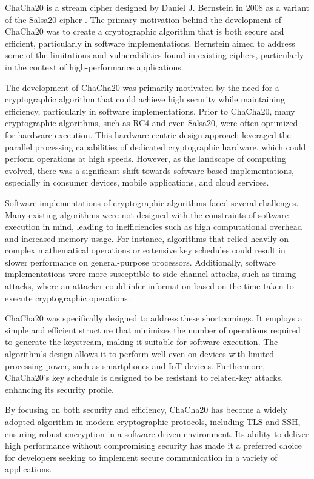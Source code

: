 \documentclass[a4paper,12pt]{report}
\begin{document}
ChaCha20 is a stream cipher designed by Daniel J. Bernstein in 2008 as a variant of the Salsa20 cipher \cite{bernstein2008chacha}.
The primary motivation behind the development of ChaCha20 was to create a cryptographic algorithm that is both secure and efficient, particularly in software implementations.
Bernstein aimed to address some of the limitations and vulnerabilities found in existing ciphers, particularly in the context of high-performance applications.

The development of ChaCha20 was primarily motivated by the need for a cryptographic algorithm that could achieve high security while maintaining efficiency, particularly in software implementations.
Prior to ChaCha20, many cryptographic algorithms, such as RC4 and even Salsa20, were often optimized for hardware execution.
This hardware-centric design approach leveraged the parallel processing capabilities of dedicated cryptographic hardware, which could perform operations at high speeds.
However, as the landscape of computing evolved, there was a significant shift towards software-based implementations, especially in consumer devices, mobile applications, and cloud services.

Software implementations of cryptographic algorithms faced several challenges.
Many existing algorithms were not designed with the constraints of software execution in mind, leading to inefficiencies such as high computational overhead and increased memory usage.
For instance, algorithms that relied heavily on complex mathematical operations or extensive key schedules could result in slower performance on general-purpose processors.
Additionally, software implementations were more susceptible to side-channel attacks, such as timing attacks, where an attacker could infer information based on the time taken to execute cryptographic operations.

ChaCha20 was specifically designed to address these shortcomings.
It employs a simple and efficient structure that minimizes the number of operations required to generate the keystream, making it suitable for software execution.
The algorithm's design allows it to perform well even on devices with limited processing power, such as smartphones and IoT devices.
Furthermore, ChaCha20's key schedule is designed to be resistant to related-key attacks, enhancing its security profile.

By focusing on both security and efficiency, ChaCha20 has become a widely adopted algorithm in modern cryptographic protocols, including TLS and SSH, ensuring robust encryption in a software-driven environment.
Its ability to deliver high performance without compromising security has made it a preferred choice for developers seeking to implement secure communication in a variety of applications.
\end{document}

